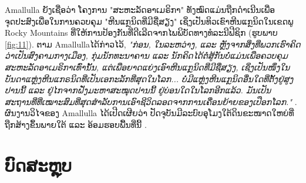 \documentclass[10pt,twocolumn,letterpaper]{article}
\begin{document}
Amallulla ຍັງເຊື່ອວ່າ ໂຄງການ "ສະຫະລັດອາເມຣິກາ" ທັງໝົດແມ່ນຖືກດໍາເນີນເພື່ອຈຸດປະສົງເພື່ອໃນການຄວບຄຸມ "ຫີນແກຼນິດທີ່ມີຊື່ສຽງ" ເຊິ່ງເປັນທິວເຂົາຫີນແກຼນິດໃນເຂດພູ Rocky Mountains ທີ່ໃຫ້ການປ້ອງກັນທີ່ດີເລີດຈາກໄພພິບັດທາງທໍລະນີຟີຊິກ (ຮູບພາບ \ref{fig:11}). 
ຕາມ Amallullaໄດ້ກ່າວໄວ້, \textit{"ກ່ອນ, ໃນລະຫວ່າງ, ແລະ ຫຼັງຈາກສິ່ງທີ່ພວກເຮົາຄິດວ່າເປັນສົງຄາມກາງເມືອງ, ກຸ່ມນັກທະນາຄານ ແລະ ນັກຄິດໄດ້ຕໍ່ສູ້ກັນບໍ່ແມ່ນເພື່ອຄວບຄຸມສະຫະລັດອາເມຣິກາເທົ່ານັ້ນ, ແຕ່ເພື່ອຍາດແຍ່ງເອົາຫີນແກຼນິດທີ່ມີຊື່ສຽງ, ເຊິ່ງເປັນໜຶ່ງໃນບັນດາແຫຼ່ງຫີນແກຣນິດທີ່ເປັນເອກະລັກທີ່ສຸດໃນໂລກ... ບໍ່ມີແຫຼ່ງຫີນແກຼນິດອື່ນໃດທີ່ຕັ້ງຢູ່ສູງປານນີ້ ແລະ ຢູ່ໄກຈາກຝັ່ງມະຫາສະໝຸດປານນີ້ ຢູ່ບ່ອນໃດໃນໂລກອີກແລ້ວ. ມັນເປັນສະຖານທີ່ທີ່ເໝາະສົມທີ່ສຸດສຳລັບການເອົາຊີວິດລອດຈາກການເຄື່ອນຍ້າຍຂອງເປືອກໂລກ."} \cite{33,34}. 
ຜົນງານວິໄຈຂອງ Amallulla ໄດ້ເປີດເຜີຍວ່າ ປັດຈຸບັນມີລະບົບອຸໂມງໃຕ້ດິນຂະໜາດໃຫຍ່ທີ່ຖືກສ້າງຂຶ້ນພາຍໃຕ້ ແລະ ອ້ອມຮອບພື້ນທີ່ນີ້ \cite{36}. 
\section{ບົດສະຫຼຸບ}
\end{document}
